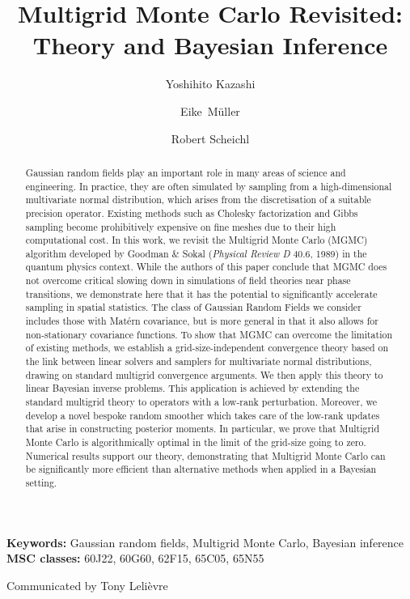 \documentclass[11pt,english]{article}
\theoremstyle{plain}
\theoremstyle{plain}
\theoremstyle{plain}
\theoremstyle{plain}
\numberwithin{equation}{section}
\newcommand{\rev}[1]{#1}
\begin{document}
\title{Multigrid Monte Carlo Revisited: Theory and Bayesian Inference}
\author[1]{Yoshihito Kazashi}
\author[2]{Eike~M\"{u}ller}
\author[3,*]{Robert Scheichl}
\maketitle
\begin{abstract}
	\noindent
	Gaussian random fields play an important role in many areas of science and engineering. In practice, they are often simulated by sampling from a high-dimensional multivariate normal distribution, which arises from the discretisation of a suitable precision operator. Existing methods such as Cholesky factorization and Gibbs sampling become prohibitively expensive on fine meshes due to their high computational cost.
	\rev{In this work, we revisit the Multigrid Monte Carlo (MGMC) algorithm developed by Goodman \& Sokal (\emph{Physical Review D} 40.6, 1989) in the quantum physics context. While the authors of this paper conclude that MGMC does not overcome critical slowing down in simulations of field theories near phase transitions, we demonstrate here that it has the potential to significantly accelerate sampling in spatial statistics. The class of Gaussian Random Fields we consider includes those with Mat\'{e}rn covariance, but is more general in that it also allows for non-stationary covariance functions. To show that MGMC can overcome the limitation of existing methods, we establish a grid-size-independent convergence theory based on the link between linear solvers and samplers for multivariate normal distributions, drawing on standard multigrid convergence arguments.}
	We then apply this theory to linear Bayesian inverse problems. This application is achieved by extending the standard multigrid theory to operators with a low-rank perturbation. 
	Moreover, we develop a novel bespoke random smoother which takes care of the low-rank updates that arise in constructing posterior moments. In particular, we prove that Multigrid Monte Carlo is algorithmically optimal in the limit of the grid-size going to zero. Numerical results support our theory, demonstrating that Multigrid Monte Carlo can be significantly more efficient than alternative methods when applied in a Bayesian setting.
\end{abstract}
\textbf{Keywords:} Gaussian random fields, Multigrid Monte Carlo, Bayesian inference\\[1ex]
\textbf{MSC classes:}
60J22, %
60G60, %
62F15, %
65C05, %
65N55  %
\begin{center}
Communicated by Tony Leli\`{e}vre
\end{center}
\end{document}
